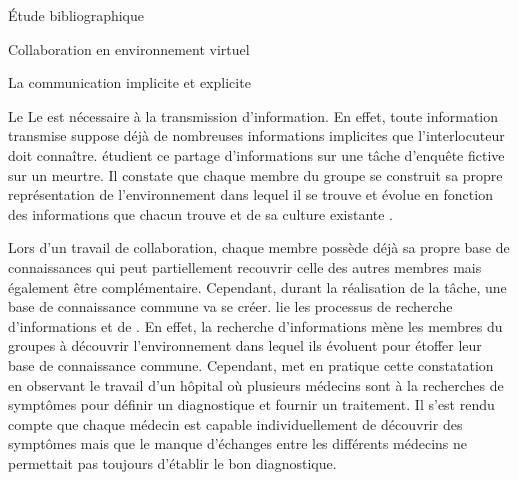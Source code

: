 \documentclass[myfrancais,ngerman,english,frenchb]{mythesis}
\begin{document}
\begin{mychapter}{Étude bibliographique}
\begin{mysection}{Collaboration en environnement virtuel}
\begin{mysubsection}{La communication implicite et explicite}
\begin{mysubsubsection}{Le }
					Le  est nécessaire à la transmission d'information.
					En effet, toute information transmise suppose déjà de nombreuses informations implicites que l'interlocuteur doit connaître.
					 étudient ce partage d'informations sur une tâche d'enquête fictive sur un meurtre.
					Il constate que chaque membre du groupe se construit sa propre représentation de l'environnement dans lequel il se trouve et évolue en fonction des informations que chacun trouve et de sa culture existante .

					Lors d'un travail de collaboration, chaque membre possède déjà sa propre base de connaissances qui peut partiellement recouvrir celle des autres membres mais également être complémentaire.
					Cependant, durant la réalisation de la tâche, une base de connaissance commune va se créer.
					 lie les processus de recherche d'informations et de .
					En effet, la recherche d'informations mène les membres du groupes à découvrir l'environnement dans lequel ils évoluent pour étoffer leur base de connaissance commune.
					Cependant,  met en pratique cette constatation en observant le travail d'un hôpital où plusieurs médecins sont à la recherches de symptômes pour définir un diagnostique et fournir un traitement.
					Il s'est rendu compte que chaque médecin est capable individuellement de découvrir des symptômes mais que le manque d'échanges entre les différents médecins ne permettait pas toujours d'établir le bon diagnostique.


\end{mysubsubsection}
\end{mysubsection}
\end{mysection}
\end{mychapter}
\end{document}
